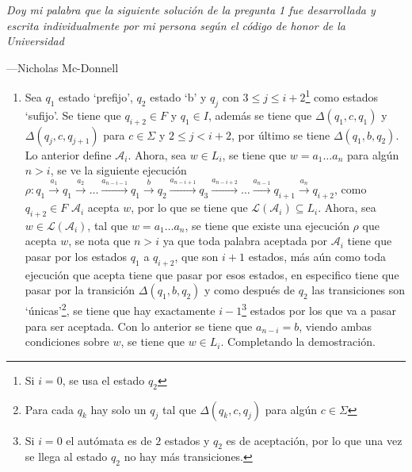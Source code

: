 \documentclass{homework}
\begin{document}
\begin{p1}
    \begin{sol}
        \textit{Doy mi palabra que la siguiente solución de la pregunta 1 fue desarrollada y escrita individualmente por mi persona según el código de honor de la Universidad}
        \begin{flushright}
            ---Nicholas Mc-Donnell
        \end{flushright}
        \begin{enumerate}
            \item Sea \(q_1\) estado `prefijo', \(q_2\) estado `b' y \(q_j\) con \(3\leq j\leq i+2\)\footnote{Si \(i=0\), se usa el estado \(q_2\)} como estados `sufijo'. Se tiene que \(q_{i+2}\in F\) y \(q_1\in I\), además se tiene que \(\Delta(q_1,c,q_1)\) y \(\Delta(q_j,c,q_{j+1})\) para \(c\in\Sigma\) y \(2\leq j<i+2\), por último se tiene \(\Delta(q_1,b,q_2)\). Lo anterior define \(\mathcal{A}_i\). Ahora, sea \(w\in L_i\), se tiene que \(w=a_1\dots a_n\) para algún \(n>i\), se ve la siguiente ejecución \(\rho:q_1\xrightarrow{a_1}q_1\xrightarrow{a_2}\dots\xrightarrow{a_{n-i-1}}q_1\xrightarrow{b}q_2\xrightarrow{a_{n-i+1}}q_3\xrightarrow{a_{n-i+2}}\dots\xrightarrow{a_{n-1}}q_{i+1}\xrightarrow{a_n}q_{i+2}\), como \(q_{i+2}\in F\) \(\mathcal{A}_i\) acepta \(w\), por lo que se tiene que \(\mathcal{L}(\mathcal{A}_i)\subseteq L_i\). Ahora, sea \(w\in\mathcal{L}(\mathcal{A}_i)\), tal que \(w=a_1\dots a_n\), se tiene que existe una ejecución \(\rho\) que acepta \(w\), se nota que \(n> i\) ya que toda palabra aceptada por \(\mathcal{A}_i\) tiene que pasar por los estados \(q_1\) a \(q_{i+2}\), que son \(i+1\) estados, más aún como toda ejecución que acepta tiene que pasar por esos estados, en especifico tiene que pasar por la transición \(\Delta(q_1,b,q_2)\) y como después de \(q_2\) las transiciones son `únicas'\footnote{Para cada \(q_k\) hay solo un \(q_j\) tal que \(\Delta(q_k,c,q_j)\) para algún \(c\in\Sigma\)}, se tiene que hay exactamente \(i-1\)\footnote{Si \(i=0\) el autómata es de \(2\) estados y \(q_2\) es de aceptación, por lo que una vez se llega al estado \(q_2\) no hay más transiciones.} estados por los que va a pasar para ser aceptada. Con lo anterior se tiene que \(a_{n-i}=b\), viendo ambas condiciones sobre \(w\), se tiene que \(w\in L_i\). Completando la demostración.

\end{enumerate}
\end{sol}
\end{p1}
\end{document}
